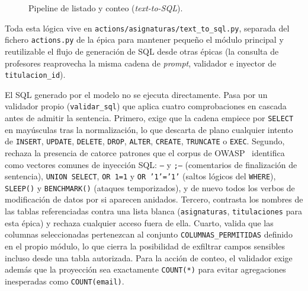 \begin{figure}[hbtp]
\centering
{}
\caption{Pipeline de listado y conteo (\textit{text-to-SQL}).}
\label{fig:pipe-asig-listado}
\end{figure}

Toda esta lógica vive en \texttt{actions/asignaturas/text\_to\_sql.py}, separada del fichero \texttt{actions.py} de la épica para mantener pequeño el módulo principal y reutilizable el flujo de generación de SQL desde otras épicas (la consulta de profesores reaprovecha la misma cadena de \textit{prompt}, validador e inyector de \texttt{titulacion\_id}).

El SQL generado por el modelo no se ejecuta directamente. Pasa por un validador propio (\texttt{validar\_sql}) que aplica cuatro comprobaciones en cascada antes de admitir la sentencia. Primero, exige que la cadena empiece por \texttt{SELECT} en mayúsculas tras la normalización, lo que descarta de plano cualquier intento de \texttt{INSERT}, \texttt{UPDATE}, \texttt{DELETE}, \texttt{DROP}, \texttt{ALTER}, \texttt{CREATE}, \texttt{TRUNCATE} o \texttt{EXEC}. Segundo, rechaza la presencia de catorce patrones que el corpus de OWASP~\cite{owasp2021injection} identifica como vectores comunes de inyección SQL: \texttt{--} y \texttt{;--} (comentarios de finalización de sentencia), \texttt{UNION SELECT}, \texttt{OR 1=1} y \texttt{OR '1'='1'} (saltos lógicos del \texttt{WHERE}), \texttt{SLEEP()} y \texttt{BENCHMARK()} (ataques temporizados), y de nuevo todos los verbos de modificación de datos por si aparecen anidados. Tercero, contrasta los nombres de las tablas referenciadas contra una lista blanca (\texttt{asignaturas}, \texttt{titulaciones} para esta épica) y rechaza cualquier acceso fuera de ella. Cuarto, valida que las columnas seleccionadas pertenezcan al conjunto \texttt{COLUMNAS\_PERMITIDAS} definido en el propio módulo, lo que cierra la posibilidad de exfiltrar campos sensibles incluso desde una tabla autorizada. Para la acción de conteo, el validador exige además que la proyección sea exactamente \texttt{COUNT(*)} para evitar agregaciones inesperadas como \texttt{COUNT(email)}.

